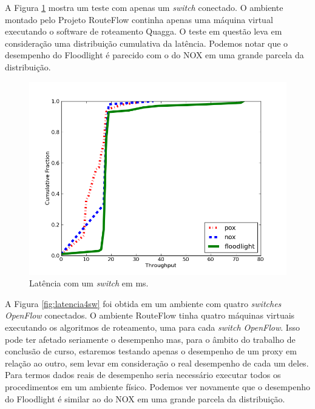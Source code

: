 A Figura \ref{fig:latencia1sw} mostra um teste com apenas
um \textit{switch} conectado. O ambiente montado pelo 
Projeto RouteFlow continha apenas uma máquina virtual
executando o software de roteamento Quagga. O teste em
questão leva em consideração uma distribuição cumulativa da
latência. Podemos notar que o desempenho do Floodlight é
parecido com o do NOX em uma grande parcela da distribuição.

\begin{figure}[h]
\centering
\includegraphics[width=140mm]{latencia_1sw.png}
\caption{Latência com um \textit{switch} em ms.}
\label{fig:latencia1sw} 
\end{figure}

A Figura \ref{fig:latencia4sw} foi obtida em um ambiente com
quatro \textit{switches} \textit{OpenFlow} conectados. O
ambiente RouteFlow tinha quatro máquinas virtuais executando
os algoritmos de roteamento, uma para cada \textit{switch OpenFlow}.
Isso pode ter afetado seriamente o desempenho mas, para
o âmbito do trabalho de conclusão de curso, estaremos 
testando apenas o desempenho de um proxy em relação ao
outro, sem levar em consideração o real desempenho de cada um
deles. Para termos dados reais de desempenho seria necessário
executar todos os procedimentos em um ambiente físico.
 Podemos ver
novamente que o desempenho do Floodlight é similar ao do
NOX em uma grande parcela da distribuição.

